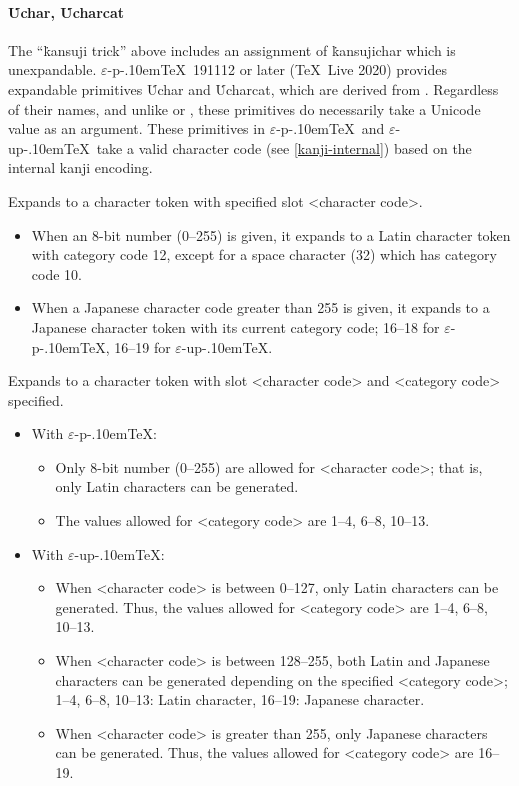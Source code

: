 \documentclass[a4paper,11pt,dvipdfmx]{article}
\let\emph=\origemph
\def\eTeXpre{$\varepsilon$-}
\def\epTeX{\leavevmode\hbox{\eTeXpre\pTeX}}
\def\eupTeX{\leavevmode\hbox{\eTeXpre\upTeX}}
\def\pTeX{p\kern-.10em\TeX}\def\upTeX{u\pTeX}
\def\TL{\TeX\ Live\xspace}
\begin{document}
\paragraph{\.{Uchar}, \.{Ucharcat}}
The ``\.{kansuji} trick'' above includes an assignment of \.{kansujichar}
which is unexpandable.
\epTeX~191112 or later (\TL2020) provides expandable primitives
\.{Uchar} and \.{Ucharcat}, which are derived from .
Regardless of their names, and unlike  or ,
these primitives do \emph{not} necessarily take
a Unicode value as an argument.
These primitives in \epTeX\ and \eupTeX\ take a valid character code
(see \ref{kanji-internal}) based on the internal kanji encoding.

\begin{simplelist}
  Expands to a character token with specified slot <character code>.
  \begin{itemize}
   \item When an 8-bit number (0--255) is given,
     it expands to a Latin character token with category code 12,
     except for a space character (32) which has category code 10.
   \item When a Japanese character code greater than 255 is given,
     it expands to a Japanese character token with its current category code;
     16--18 for \epTeX, 16--19 for \eupTeX.
  \end{itemize}

  Expands to a character token with slot <character code> and
  <category code> specified.
  \begin{itemize}
   \item With \epTeX:
     \begin{itemize}
      \item Only 8-bit number (0--255) are allowed for <character code>;
        that is, only Latin characters can be generated.
      \item The values allowed for <category code> are 1--4, 6--8, 10--13.
     \end{itemize}
   \item With \eupTeX:
     \begin{itemize}
      \item When <character code> is between 0--127,
        only Latin characters can be generated.
        Thus, the values allowed for <category code> are
        1--4, 6--8, 10--13.
      \item When <character code> is between 128--255,
        both Latin and Japanese characters can be generated
        depending on the specified <category code>;
        1--4, 6--8, 10--13: Latin character,
        16--19: Japanese character.
      \item When <character code> is greater than 255,
        only Japanese characters can be generated.
        Thus, the values allowed for <category code> are
        16--19.
     \end{itemize}
  \end{itemize}
\end{simplelist}
\end{document}
